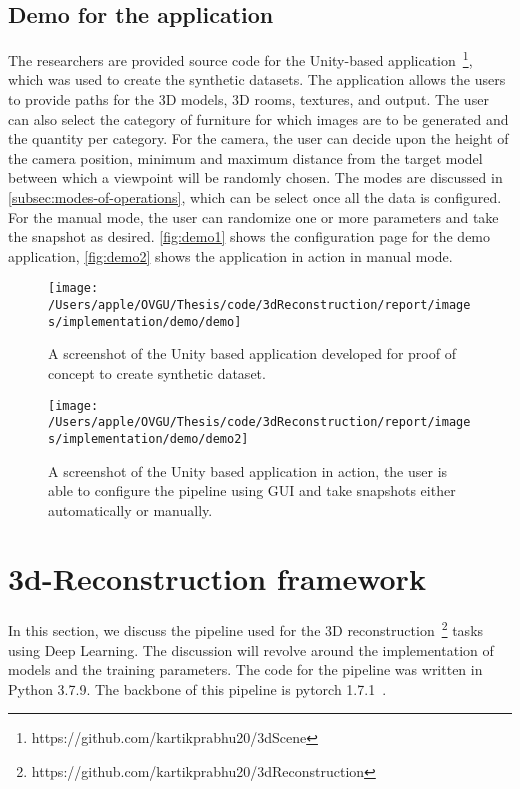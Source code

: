 \subsection{Demo for the application}\label{subsec:demo}

The researchers are provided source code for the Unity-based application~\footnote{https://github.com/kartikprabhu20/3dScene}, which was used to create the synthetic datasets.
The application allows the users to provide paths for the 3D models, 3D rooms, textures, and output.
The user can also select the category of furniture for which images are to be generated and the quantity per category.
For the camera, the user can decide upon the height of the camera position, minimum and maximum distance from the target model between which a viewpoint will be randomly chosen.
The modes are discussed in \autoref{subsec:modes-of-operations}, which can be select once all the data is configured.
For the manual mode, the user can randomize one or more parameters and take the snapshot as desired.
\autoref{fig:demo1} shows the configuration page for the demo application, \autoref{fig:demo2} shows the application in action in manual mode.

\begin{figure}
    \centering
    \texttt{[image: /Users/apple/OVGU/Thesis/code/3dReconstruction/report/images/implementation/demo/demo]}
    \caption{A screenshot of the Unity based application developed for proof of concept to create synthetic dataset.}
    \label{fig:demo1}
\end{figure}

\begin{figure}
    \centering
    \texttt{[image: /Users/apple/OVGU/Thesis/code/3dReconstruction/report/images/implementation/demo/demo2]}
    \caption{A screenshot of the Unity based application in action, the user is able to configure the pipeline using GUI and take snapshots either automatically or manually.}
    \label{fig:demo2}
\end{figure}

\section{3d-Reconstruction framework}\label{sec:3d-reconstruction-framework}

In this section, we discuss the pipeline used for the 3D reconstruction~\footnote{https://github.com/kartikprabhu20/3dReconstruction} tasks using Deep Learning.
The discussion will revolve around the implementation of models and the training parameters.
The code for the pipeline was written in Python 3.7.9.
The backbone of this pipeline is pytorch 1.7.1~\cite{NEURIPS2019_9015}.

